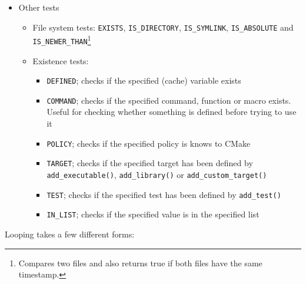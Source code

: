 \documentclass[table, xcdraw]{article}%
\begin{document}
\begin{itemize}
\begin{itemize}
\begin{itemize}
        \item Strings\footnote{CMake also supports testing a string against a regular expression.}: \texttt{STRLESS}, \texttt{STRGREATER}, \texttt{STREQUAL}, \texttt{STRLESS_EQUAL} and \texttt{STRGREATER_EQUAL}
        \item Version numbers\footnote{Same robustness caveats as numeric comparisons.}: \texttt{VERSION_LESS}, \texttt{VERSION_GREATER}, \texttt{VERSION_EQUAL}, \texttt{VERSION_LESS_EQUAL} and \texttt{VERSION_GREATER_EQUAL}
    \end{itemize}
\end{itemize}
\item Other tests
\begin{itemize}
    \item File system tests: \texttt{EXISTS}, \texttt{IS_DIRECTORY}, \texttt{IS_SYMLINK}, \texttt{IS_ABSOLUTE} and \texttt{IS_NEWER_THAN}\footnote{Compares two files and also returns true if both files have the same timestamp.}
    \item Existence tests:
    \begin{itemize}
        \item \texttt{DEFINED}; checks if the specified (cache) variable exists
        \item \texttt{COMMAND}; checks if the specified command, function or macro exists. Useful for checking whether something is defined before trying to use it
        \item \texttt{POLICY}; checks if the specified policy is knows to CMake
        \item \texttt{TARGET}; checks if the specified target has been defined by \texttt{add_executable()}, \texttt{add_library()} or \texttt{add_custom_target()}
        \item \texttt{TEST}; checks if the specified test has been defined by \texttt{add_test()}
        \item \texttt{IN_LIST}; checks if the specified value is in the specified list
    \end{itemize}
\end{itemize}
\end{itemize}

Looping takes a few different forms:
\end{document}
